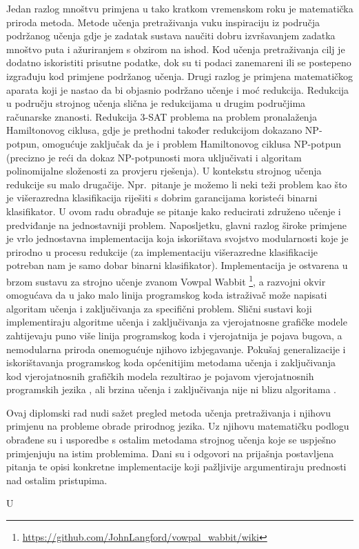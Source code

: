 Jedan razlog mnoštvu primjena u tako kratkom vremenskom roku je matematička
priroda metoda. Metode učenja pretraživanja vuku inspiraciju iz područja
podržanog učenja  gdje je zadatak sustava naučiti
dobru  izvršavanjem zadatka mnoštvo
puta i ažuriranjem s obzirom na ishod. Kod učenja pretraživanja cilj je dodatno
iskoristiti prisutne podatke, dok su ti podaci zanemareni ili se postepeno
izgrađuju kod primjene podržanog učenja. Drugi razlog je primjena matematičkog
aparata koji je nastao da bi objasnio podržano učenje i moć redukcija. Redukcija
u području strojnog učenja slična je redukcijama u drugim područjima računarske
znanosti. Redukcija 3-SAT problema na problem pronalaženja Hamiltonovog ciklusa,
gdje je prethodni također redukcijom dokazano NP-potpun, omogućuje zaključak da
je i problem Hamiltonovog ciklusa NP-potpun (precizno je reći da dokaz
NP-potpunosti mora uključivati i algoritam polinomijalne složenosti za provjeru
rješenja). U kontekstu strojnog učenja redukcije su malo drugačije. Npr.~pitanje
je možemo li neki teži problem kao što je višerazredna klasifikacija riješiti s
dobrim garancijama koristeći binarni klasifikator. U ovom radu obrađuje se
pitanje kako reducirati združeno učenje i predviđanje  na jednostavniji problem. Naposljetku, glavni razlog široke primjene
je vrlo jednostavna implementacija koja iskorištava svojstvo modularnosti koje
je prirodno u procesu redukcije (za implementaciju višerazredne klasifikacije
potreban nam je samo dobar binarni klasifikator). Implementacija je ostvarena u
brzom sustavu za strojno učenje zvanom Vowpal Wabbit
\footnote{\url{https://github.com/JohnLangford/vowpal_wabbit/wiki}}, a \lts{}
razvojni okvir omogućava da u jako malo linija programskog koda istraživač može
napisati algoritam učenja i zaključivanja za specifični problem. Slični sustavi
koji implementiraju algoritme učenja i zaključivanja za vjerojatnosne grafičke
modele zahtijevaju puno više linija programskog koda i vjerojatnija je pojava
bugova, a nemodularna priroda onemogućuje njihovo izbjegavanje. Pokušaj
generalizacije i iskorištavanja programskog koda općenitijim metodama učenja i
zaključivanja kod vjerojatnosnih grafičkih modela rezultirao je pojavom
vjerojatnosnih programskih jezika ,
ali brzina učenja i zaključivanja nije ni blizu algoritama \lts{}.

Ovaj diplomski rad nudi sažet pregled metoda učenja pretraživanja i njihovu
primjenu na probleme obrade prirodnog jezika. Uz njihovu matematičku podlogu
obrađene su i usporedbe s ostalim metodama strojnog učenja koje se uspješno
primjenjuju na istim problemima. Dani su i odgovori na prijašnja postavljena
pitanja te opisi konkretne implementacije koji pažljivije argumentiraju
prednosti nad ostalim pristupima.

U 

